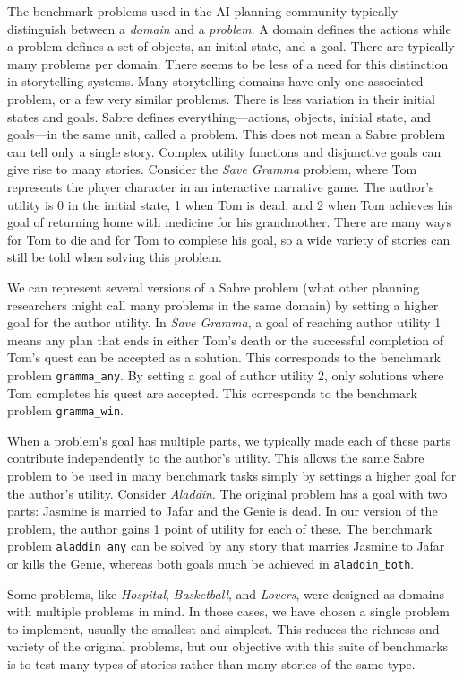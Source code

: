 \documentclass{nilreport}
\begin{document}
The benchmark problems used in the AI planning community typically
distinguish between a \emph{domain} and a \emph{problem}. A domain
defines the actions while a problem defines a set of objects, an initial
state, and a goal. There are typically many problems per domain. There
seems to be less of a need for this distinction in storytelling systems.
Many storytelling domains have only one associated problem, or a few
very similar problems. There is less variation in their initial states
and goals. Sabre defines everything---actions, objects, initial state,
and goals---in the same unit, called a problem. This does not mean
a Sabre problem can tell only a single story. Complex utility functions
and disjunctive goals can give rise to many stories. Consider the
\emph{Save Gramma} problem, where Tom represents the player character
in an interactive narrative game. The author's utility is 0 in the
initial state, 1 when Tom is dead, and 2 when Tom achieves his goal
of returning home with medicine for his grandmother. There are many
ways for Tom to die and for Tom to complete his goal, so a wide variety
of stories can still be told when solving this problem.

We can represent several versions of a Sabre problem (what other planning
researchers might call many problems in the same domain) by setting
a higher goal for the author utility. In \emph{Save Gramma}, a goal
of reaching author utility 1 means any plan that ends in either Tom's
death or the successful completion of Tom's quest can be accepted
as a solution. This corresponds to the benchmark problem \texttt{gramma\_any}.
By setting a goal of author utility 2, only solutions where Tom completes
his quest are accepted. This corresponds to the benchmark problem
\texttt{gramma\_win}.

When a problem's goal has multiple parts, we typically made each of
these parts contribute independently to the author's utility. This
allows the same Sabre problem to be used in many benchmark tasks simply
by settings a higher goal for the author's utility. Consider \emph{Aladdin}.
The original problem has a goal with two parts: Jasmine is married
to Jafar and the Genie is dead. In our version of the problem, the
author gains 1 point of utility for each of these. The benchmark problem
\texttt{aladdin\_any} can be solved by any story that marries Jasmine
to Jafar or kills the Genie, whereas both goals much be achieved in
\texttt{aladdin\_both}.

Some problems, like \emph{Hospital}, \emph{Basketball}, and \emph{Lovers},
were designed as domains with multiple problems in mind. In those
cases, we have chosen a single problem to implement, usually the smallest
and simplest. This reduces the richness and variety of the original
problems, but our objective with this suite of benchmarks is to test
many types of stories rather than many stories of the same type.
\end{document}
